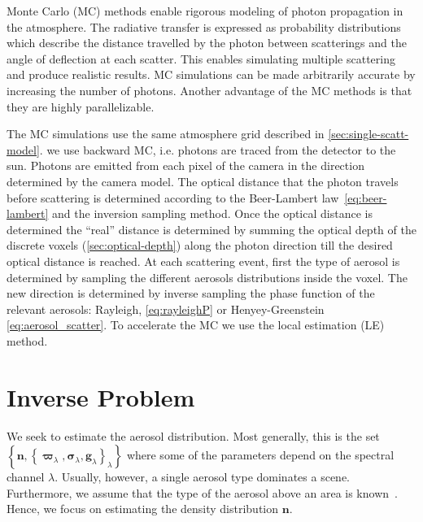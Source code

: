 \documentclass[10pt,letterpaper]{article}
\newcommand{\vect}[1]{\bm{#1}}
\begin{document}
Monte Carlo (MC) methods enable rigorous modeling of photon
propagation in the atmosphere. The radiative transfer is expressed as
probability distributions which describe the distance travelled by the
photon between scatterings and the angle of deflection at each
scatter.  This enables simulating multiple scattering and produce
realistic results.  MC simulations can be made arbitrarily accurate by
increasing the number of photons.  Another advantage of the MC methods
is that they are highly parallelizable.

The MC simulations use the same atmosphere grid described in
\cref{sec:single-scatt-model}. we use backward MC, i.e. photons are
traced from the detector to the sun. Photons are emitted from each
pixel of the camera in the direction determined by the camera
model. The optical distance that the photon travels before scattering
is determined according to the Beer-Lambert law~\cref{eq:beer-lambert}
and the inversion sampling method. Once the optical distance is
determined the ``real'' distance is determined by summing the optical
depth of the discrete voxels (\cref{sec:optical-depth}) along the
photon direction till the desired optical distance is reached.  At
each scattering event, first the type of aerosol is determined by
sampling the different aerosols distributions inside the voxel. The
new direction is determined by inverse sampling the phase function of
the relevant aerosols: Rayleigh, \cref{eq:rayleighP} or
Henyey-Greenstein \cref{eq:aerosol_scatter}.  To accelerate the MC we
use the local estimation (LE) method.



\section{Inverse Problem}
\label{sec:inverse-problem}

We seek to estimate the aerosol distribution. Most generally, this is the set
$\left\{{\bm n},\left\{\vect{\varpi}_{\lambda},\vect{\sigma}_{\lambda},{\bm
        g}_{\lambda}\right\}_{\lambda}\right\}$
where some of the parameters depend on the spectral channel $\lambda$. Usually, however, a single aerosol type dominates a scene. Furthermore, we assume that the type of the aerosol above an area is known~\cite{Martonchik2009}. Hence, we focus on estimating the density distribution ${\bm n}$.
\end{document}
